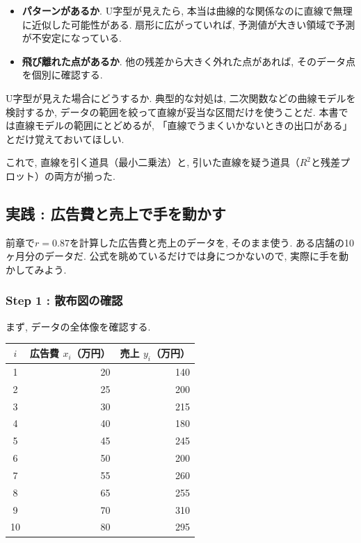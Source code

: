 \begin{itemize}
  \item \textbf{パターンがあるか}. U字型が見えたら, 本当は曲線的な関係なのに直線で無理に近似した可能性がある. 扇形に広がっていれば, 予測値が大きい領域で予測が不安定になっている.
  \item \textbf{飛び離れた点があるか}. 他の残差から大きく外れた点があれば, そのデータ点を個別に確認する.
\end{itemize}

U字型が見えた場合にどうするか.
典型的な対処は, 二次関数などの曲線モデルを検討するか, データの範囲を絞って直線が妥当な区間だけを使うことだ.
本書では直線モデルの範囲にとどめるが, 「直線でうまくいかないときの出口がある」とだけ覚えておいてほしい.

これで, 直線を引く道具（最小二乗法）と, 引いた直線を疑う道具（$R^2$と残差プロット）の両方が揃った.


\subsection{実践 : 広告費と売上で手を動かす}

前章で$r = 0.87$を計算した広告費と売上のデータを, そのまま使う.
ある店舗の10ヶ月分のデータだ.
公式を眺めているだけでは身につかないので, 実際に手を動かしてみよう.

\subsubsection*{Step 1 : 散布図の確認}

まず, データの全体像を確認する.

\begin{center}
\begin{tabular}{crr}
\hline
$i$ & 広告費 $x_i$（万円） & 売上 $y_i$（万円） \\
\hline
1 & 20 & 140 \\
2 & 25 & 200 \\
3 & 30 & 215 \\
4 & 40 & 180 \\
5 & 45 & 245 \\
6 & 50 & 200 \\
7 & 55 & 260 \\
8 & 65 & 255 \\
9 & 70 & 310 \\
10 & 80 & 295 \\
\hline
\end{tabular}
\end{center}

